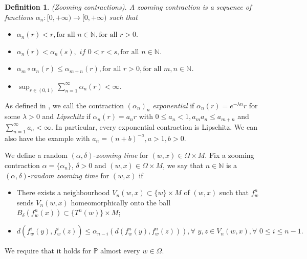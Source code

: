 \documentclass[12pt,a4paper]{amsart}
\theoremstyle{plain}
\newtheorem{definition}{Definition}
\begin{document}
	\begin{definition}
		(Zooming contractions). A \textit{zooming contraction} is a sequence of functions $\alpha_{n}: [0,+\infty) \to [0,+\infty)$ such that
		
		\begin{itemize}
			\item $\alpha_{n}(r) < r, \text{for all} \, \, n \in \mathbb{N}, \text{for all} \, \, r>0.$
			
			\item $\alpha_{n}(r)<\alpha_{n}(s), \,\, if \,\, 0<r<s, \text{for all} \, \, n \in \mathbb{N}$.
			
			\item $\alpha_{m} \circ \alpha_{n}(r) \leq \alpha_{m+n}(r), \text{for all} \, \, r>0, \text{for all} \, \, m,n \in \mathbb{N}$.
			
			\item $\displaystyle \sup_{r \in (0,1)} \sum_{n=1}^{\infty}\alpha_{n}(r) < \infty$.
		\end{itemize}
		
	\end{definition}
	
	As defined in \cite{PV}, we call the contraction $(\alpha_{n})_{n}$ \textit{exponential} if $\alpha_{n}(r) = e^{-\lambda n} r$ for some $\lambda > 0$ and \textit{Lipschitz} if $\alpha_{n}(r) = a_{n} r$ with $0 \leq a_{n} < 1, a_{m}a_{n} \leq a_{m+n}$ and $\sum_{n=1}^{\infty} a_{n} < \infty$. In particular, every exponential contraction is Lipschitz. We can also have the example with $a_{n} = (n+b)^{-a}, a > 1, b>0$.
	
	We define a random $(\alpha,\delta)$-{\it zooming time} for $(w,x) \in \Omega \times M$. Fix a zooming contraction $\alpha=\{\alpha_n\}$, $\delta > 0$ and $(w,x) \in \Omega \times M$, we say that $n \in \mathbb{N}$ is a $(\alpha, \delta)$-{\textit{random zooming time}} for $(w,x)$ if
	\begin{itemize}
		\item [(i)] There exists a neighbourhood $V_{n}(w,x) \subset \{w\} \times M$ of $(w,x)$ such that $f^{n}_{w}$ sends  $ V_{n}(w,x)$ homeomorphically onto the ball $ B_{\delta}(f^{n}_{w}(x)) \subset \{T^{n}(w)\} \times M$;
		\item [(ii)] $d(f^{i}_{w}(y),f^{i}_{w}(z)) \leq \alpha_{n-i}(d(f^{n}_{w}(y),f^{n}_{w}(z))), \forall \,\, y,z \in V_{n}(w,x), \forall \,\, 0 \leq i \leq n-1.$
	\end{itemize}
	
	We require that it holds for $\mathbb{P}$ almost every $w \in \Omega$. 
	
\end{document}
